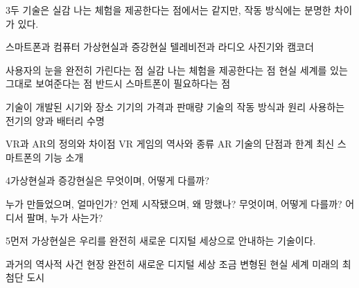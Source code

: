 \documentclass[fs85,seriesRus]{korfarm-base}
\begin{document}
\begin{kfSentenceUnit}{3}{두 기술은 실감 나는 체험을 제공한다는 점에서는 같지만, 작동 방식에는 분명한 차이가 있다.}
\begin{kfChoices}
\kfChoice 스마트폰과 컴퓨터
\kfChoice 가상현실과 증강현실
\kfChoice 텔레비전과 라디오
\kfChoice 사진기와 캠코더
\end{kfChoices}
\begin{kfChoices}
\kfChoice 사용자의 눈을 완전히 가린다는 점
\kfChoice 실감 나는 체험을 제공한다는 점
\kfChoice 현실 세계를 있는 그대로 보여준다는 점
\kfChoice 반드시 스마트폰이 필요하다는 점
\end{kfChoices}
\begin{kfChoices}
\kfChoice 기술이 개발된 시기와 장소
\kfChoice 기기의 가격과 판매량
\kfChoice 기술의 작동 방식과 원리
\kfChoice 사용하는 전기의 양과 배터리 수명
\end{kfChoices}
\begin{kfChoices}
\kfChoice VR과 AR의 정의와 차이점
\kfChoice VR 게임의 역사와 종류
\kfChoice AR 기술의 단점과 한계
\kfChoice 최신 스마트폰의 기능 소개
\end{kfChoices}
\end{kfSentenceUnit}

\begin{kfSentenceUnit}{4}{가상현실과 증강현실은 무엇이며, 어떻게 다를까?}
\begin{kfChoices}
\kfChoice 누가 만들었으며, 얼마인가?
\kfChoice 언제 시작됐으며, 왜 망했나?
\kfChoice 무엇이며, 어떻게 다를까?
\kfChoice 어디서 팔며, 누가 사는가?
\end{kfChoices}
\end{kfSentenceUnit}

\begin{kfSentenceUnit}{5}{먼저 가상현실은 우리를 완전히 새로운 디지털 세상으로 안내하는 기술이다.}
\begin{kfChoices}
\kfChoice 과거의 역사적 사건 현장
\kfChoice 완전히 새로운 디지털 세상
\kfChoice 조금 변형된 현실 세계
\kfChoice 미래의 최첨단 도시
\end{kfChoices}
\end{kfSentenceUnit}
\end{document}
